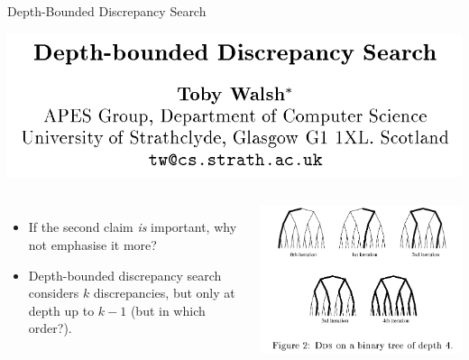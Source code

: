 \documentclass{beamer}
\begin{document}
\begin{frame}{Depth-Bounded Discrepancy Search}

    \centering\includegraphics*[keepaspectratio=true,scale=0.2]{dds-paper.png}
    \vspace{1em}

    \begin{columns}[T]
        \begin{itemize}
            \item If the second claim \emph{is} important, why not emphasise it more?

            \item Depth-bounded discrepancy search considers $k$ discrepancies, but only at depth up
                to $k - 1$ (but in which order?).
        \end{itemize}
        \centering\includegraphics*[keepaspectratio=true,scale=0.2]{dds-tree.png}
    \end{columns}

\end{frame}
\end{document}
